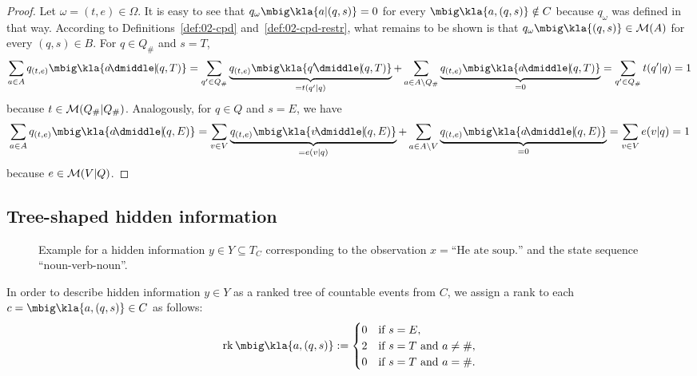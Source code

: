 \begin{proof}
 Let $\omega=(t,e)\in\Omega$. It is easy to see that
 $q_\omega\mbig\kla{a|(q,s)} = 0$ for every $\mbig\kla{a,(q,s)}\notin C$
 because $q_\omega$ was defined in that way. According to
 Definitions~\ref{def:02-cpd} and~\ref{def:02-cpd-restr}, what remains to be
 shown is that $q_\omega\mbig\kla{(q,s)}\in\um(A)$ for every $(q,s)\in B$. For
 $q\in Q_\#$ and $s = T$,
 \[
  \sum_{a\in A} q_{(t,e)}\mbig\kla{a\npipe(q,T)}
  = \sum_{q'\in Q_\#} \underbrace{q_{(t,e)}\mbig\kla{q'\npipe(q,T)}}_{=t(q'|q)}
  + \sum_{a\in A\setminus Q_\#} \underbrace{q_{(t,e)}\mbig\kla{a\npipe(q,T)}}_{=0}
  = \sum_{q'\in Q_\#} t(q'|q) = 1
 \]
 because $t\in\mathcal M(Q_\#|Q_\#)$. Analogously, for $q\in Q$ and $s = E$, we have
 \[
  \sum_{a\in A} q_{(t,e)}\mbig\kla{a\npipe(q,E)}
  = \sum_{v\in V} \underbrace{q_{(t,e)}\mbig\kla{v\npipe(q,E)}}_{=e(v|q)}
  + \sum_{a\in A\setminus V} \underbrace{q_{(t,e)}\mbig\kla{a\npipe(q,E)}}_{=0}
  = \sum_{v\in V} e(v|q) = 1
 \]
 because $e\in\mathcal M(V|Q)$.
\end{proof}

\subsection{Tree-shaped hidden information}

\begin{figure}[t!]
 \centering
 \caption{Example for a hidden information $y\in Y\subseteq T_C$ corresponding
 to the observation $x = \text{``He ate soup.''}$ and the state sequence
 ``noun-verb-noun''.\label{fig:03-example-y}}
\end{figure}

In order to describe hidden information $y\in Y$ as a ranked tree of countable
events from $C$, we assign a rank to each $c = \mbig\kla{a,(q,s)}\in C$ as follows:
\begin{align*}
 \rk\mbig\kla{a,(q,s)} := \begin{cases}
  0 & \text{if } s = E, \\
  2 & \text{if } s = T \text{ and } a\neq\#, \\
  0 & \text{if } s = T \text{ and } a = \#.
 \end{cases}
\end{align*}

